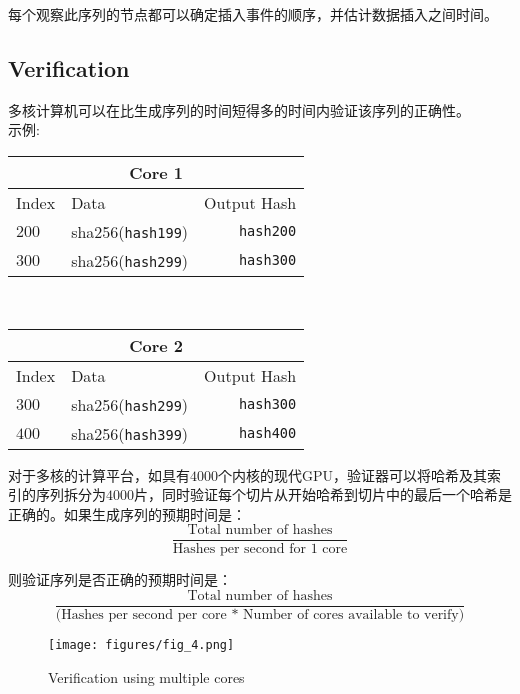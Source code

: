 \documentclass[12pt, uft8]{ctexart}
\begin{document}
每个观察此序列的节点都可以确定插入事件的顺序，并估计数据插入之间时间。

\subsection{Verification}\label{poh:verify}
多核计算机可以在比生成序列的时间短得多的时间内验证该序列的正确性。\\

\noindent 示例: \\\noindent

\begin{center}

\begin{tabular}{l l r}
    \multicolumn{3}{c}{Core 1} \\ \hline
    Index & Data & Output Hash \\ \hline
    $200$ & sha256(\texttt{hash199}) & \texttt{hash200} \\
    $300$ & sha256(\texttt{hash299}) & \texttt{hash300}\\
    \end{tabular}\\

  \begin{tabular}{l l r}
    \multicolumn{3}{c}{Core 2} \\
    \hline
    Index & Data & Output Hash \\ \hline
    $300$ & sha256(\texttt{hash299}) & \texttt{hash300} \\
    $400$ & sha256(\texttt{hash399}) & \texttt{hash400}\\
    \end{tabular}

\end{center}


对于多核的计算平台，如具有$4000$个内核的现代GPU，验证器可以将哈希及其索引的序列拆分为$4000$片，同时验证每个切片从开始哈希到切片中的最后一个哈希是正确的。如果生成序列的预期时间是：\\


\[
\frac{\textrm{Total number of hashes}}{\textrm{Hashes per second for 1 core}}
\]

\noindent 则验证序列是否正确的预期时间是：\\

\[
\frac{\textrm{Total number of hashes}}{\textrm{(Hashes per second per core * Number of cores available to verify)}}
\]

\begin{figure}
  \begin{center}
    \centering
    \texttt{[image: figures/fig\_4.png]}
    \caption[Figure 4]{Verification using multiple cores\label{fig:poh_verify}}
  \end{center}
  \end{figure}
\end{document}
